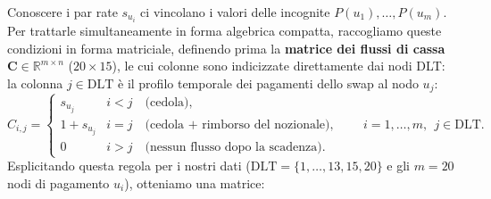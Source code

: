 \documentclass[11pt,a4paper]{article}
\theoremstyle{plain}
\theoremstyle{definition}
\theoremstyle{remark}
\newcommand{\DLT}{\mathrm{DLT}}
\begin{document}
Conoscere i par rate $s_{u_i}$ ci vincolano i valori delle
incognite $P(u_1),\ldots,P(u_m)$. Per trattarle simultaneamente in forma algebrica compatta,
raccogliamo queste condizioni in forma matriciale, definendo prima la \textbf{matrice dei flussi di cassa}
$\mathbf{C}\in\mathbb{R}^{m\times n}$ ($20\times 15$), le cui colonne sono indicizzate
direttamente dai nodi DLT: la colonna $j\in\DLT$ \`e il profilo temporale dei pagamenti dello
swap al nodo $u_j$:
\[
  C_{i,j} =
  \begin{cases}
    s_{u_j}     & i < j \quad\text{(cedola),}\\
    1 + s_{u_j} & i = j \quad\text{(cedola + rimborso del nozionale),}\\
    0           & i > j \quad\text{(nessun flusso dopo la scadenza).}
  \end{cases}
  \qquad i=1,\ldots,m,\ \ j\in\DLT.
\]
Esplicitando questa regola per i nostri dati ($\DLT=\{1,\ldots,13,15,20\}$ e gli $m=20$ nodi
di pagamento $u_i$), otteniamo una matrice:
\setcounter{MaxMatrixCols}{20}
\end{document}
